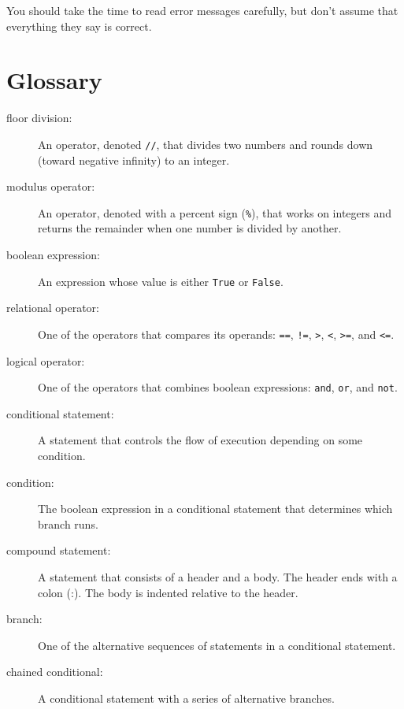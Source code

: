 \documentclass[10pt]{book}
\begin{document}
You should take the time to read error messages carefully, but don't
assume that everything they say is correct.


\section{Glossary}

\begin{description}

\item[floor division:] An operator, denoted {\tt //}, that divides two
  numbers and rounds down (toward negative infinity) to an integer.

\item[modulus operator:]  An operator, denoted with a percent sign
({\tt \%}), that works on integers and returns the remainder when one
number is divided by another.

\item[boolean expression:]  An expression whose value is either 
{\tt True} or {\tt False}.

\item[relational operator:] One of the operators that compares
its operands: {\tt ==}, {\tt !=}, {\tt >}, {\tt <}, {\tt >=}, and {\tt <=}.

\item[logical operator:] One of the operators that combines boolean
expressions: {\tt and}, {\tt or}, and {\tt not}.

\item[conditional statement:]  A statement that controls the flow of
execution depending on some condition.

\item[condition:] The boolean expression in a conditional statement
that determines which branch runs.

\item[compound statement:]  A statement that consists of a header
and a body.  The header ends with a colon (:).  The body is indented
relative to the header.

\item[branch:] One of the alternative sequences of statements in
a conditional statement.

\item[chained conditional:]  A conditional statement with a series
of alternative branches.


\end{description}
\end{document}
